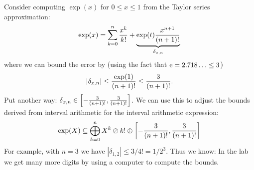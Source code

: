\begin{example} Consider computing $\exp(x)$ for $0 \ensuremath{\leq} x \ensuremath{\leq} 1$ from the Taylor series approximation:
\[
\exp(x) = \sum_{k=0}^n {x^k \over k!} + \underbrace{\exp(t){x^{n+1} \over (n+1)!}}_{\ensuremath{\delta}_{x,n}}
\]
where we can bound the error by (using the fact that ${\rm e} = 2.718\ldots \leq 3$)
\[
|\ensuremath{\delta}_{x,n}| \ensuremath{\leq} {\exp(1) \over (n+1)!} \ensuremath{\leq} {3 \over (n+1)!}.
\]
Put another way: $\ensuremath{\delta}_{x,n} \ensuremath{\in} \left[-{3 \over (n+1)!}, {3 \over (n+1)!}\right]$. We can use this to adjust the bounds derived from interval arithmetic for the interval arithmetic expression:
\[
\exp(X) \ensuremath{\subseteq} \ensuremath{\bigoplus}_{k=0}^n {X^k \ensuremath{\oslash} k!} \ensuremath{\oplus} \left[-{3 \over (n+1)!}, {3 \over (n+1)!}\right]
\]
For example, with $n = 3$ we have $|\ensuremath{\delta}_{1,2}| \ensuremath{\leq} 3/4! = 1/2^3$. Thus we know:
In the lab we get many more digits by using a computer to compute the bounds. \end{example}



